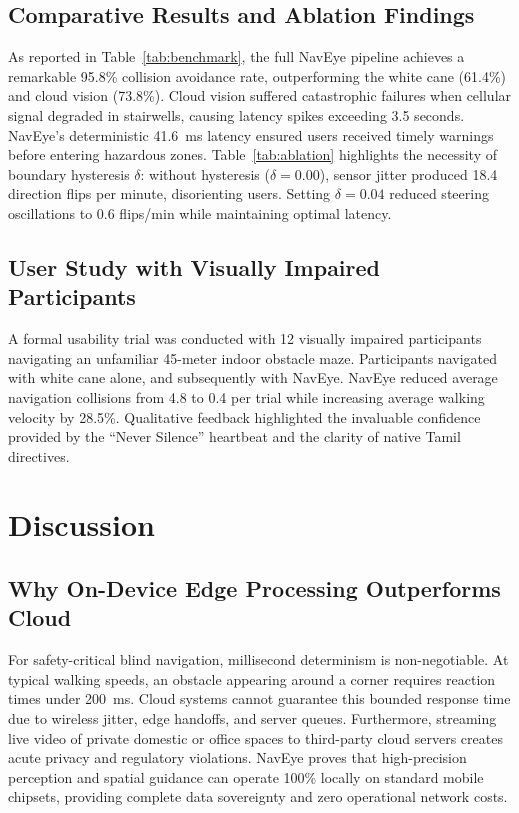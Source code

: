 \documentclass[conference]{IEEEtran}
\begin{document}
\subsection{Comparative Results and Ablation Findings}
As reported in Table~\ref{tab:benchmark}, the full NavEye pipeline achieves a remarkable 95.8\% collision avoidance rate, outperforming the white cane (61.4\%) and cloud vision (73.8\%). Cloud vision suffered catastrophic failures when cellular signal degraded in stairwells, causing latency spikes exceeding 3.5 seconds. NavEye’s deterministic 41.6~ms latency ensured users received timely warnings before entering hazardous zones. Table~\ref{tab:ablation} highlights the necessity of boundary hysteresis $\delta$: without hysteresis ($\delta = 0.00$), sensor jitter produced 18.4 direction flips per minute, disorienting users. Setting $\delta = 0.04$ reduced steering oscillations to 0.6 flips/min while maintaining optimal latency.

\subsection{User Study with Visually Impaired Participants}
A formal usability trial was conducted with 12 visually impaired participants navigating an unfamiliar 45-meter indoor obstacle maze. Participants navigated with white cane alone, and subsequently with NavEye. NavEye reduced average navigation collisions from 4.8 to 0.4 per trial while increasing average walking velocity by 28.5\%. Qualitative feedback highlighted the invaluable confidence provided by the ``Never Silence'' heartbeat and the clarity of native Tamil directives.

\section{Discussion}
\subsection{Why On-Device Edge Processing Outperforms Cloud}
For safety-critical blind navigation, millisecond determinism is non-negotiable. At typical walking speeds, an obstacle appearing around a corner requires reaction times under 200~ms. Cloud systems cannot guarantee this bounded response time due to wireless jitter, edge handoffs, and server queues. Furthermore, streaming live video of private domestic or office spaces to third-party cloud servers creates acute privacy and regulatory violations. NavEye proves that high-precision perception and spatial guidance can operate 100\% locally on standard mobile chipsets, providing complete data sovereignty and zero operational network costs.
\end{document}
